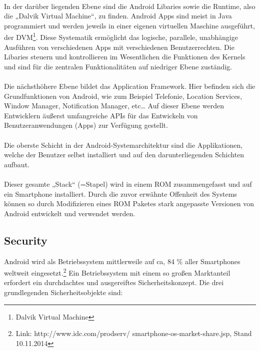 \paragraph*{}
In der darüber liegenden Ebene sind die Android Libaries sowie die Runtime, also die „Dalvik Virtual Machine“, zu finden. \newline
Android Apps sind meist in Java programmiert und werden jeweils in einer eigenen virtuellen Maschine ausgeführt, der DVM\footnote{Dalvik Virtual Machine}. Diese Systematik ermöglicht das logische, parallele, unabhängige Ausführen von verschiedenen Apps mit verschiedenen Benutzerrechten.
Die Libaries steuern und kontrollieren im Wesentlichen die Funktionen des Kernels und sind für die zentralen Funktionalitäten auf niedriger Ebene zuständig.
\paragraph*{}
Die nächsthöhere Ebene bildet das Application Framework. Hier befinden sich die Grundfunktionen von Android, wie zum Beispiel Telefonie, Location Services, Window Manager, Notification Manager, etc… 
Auf dieser Ebene werden Entwicklern äußerst umfangreiche APIs für das Entwickeln von Benutzeranwendungen (Apps) zur Verfügung gestellt.
\paragraph*{}
Die oberste Schicht in der Android-Systemarchitektur sind die Applikationen, welche der Benutzer selbst installiert und auf den darunterliegenden Schichten aufbaut.
\paragraph*{}
Dieser gesamte „Stack“ (=Stapel) wird in einem ROM zusammengefasst und auf ein Smartphone installiert. Durch die zuvor erwähnte Offenheit des Systems können so durch Modifizieren eines ROM Paketes stark angepasste Versionen von Android entwickelt und verwendet werden.


\subsection{Security}
Android wird als Betriebssystem mittlerweile auf ca, 84 \% aller Smartphones weltweit eingesetzt.\footnote{Link: http://www.idc.com/prodserv/									smartphone-os-market-share.jsp, Stand 10.11.2014} Ein Betriebssystem mit einem so großen Marktanteil erfordert ein durchdachtes und ausgereiftes Sicherheitskonzept.
Die drei grundlegenden Sicherheitsobjekte sind:

